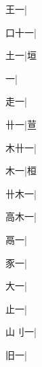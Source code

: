 \begin{multicols}{2}
{{\cjk{}{\cnsym{}　}王一}|{}\par
{\cjk{}口十一}|{}\par
{\cjk{}{\cnsym{}　}土一}|{\cjk{}垣}\par
{一}|{}\par
{\cjk{}{\cnsym{}　}走一}|{}\par
{\cjk{}{\cnsym{}　}卄一}|{\cjk{}荁}\par
{\cjk{}木卄一}|{}\par
{\cjk{}{\cnsym{}　}木一}|{\cjk{}桓}\par
{\cjk{}卄木一}|{}\par
{\cjk{}高木一}|{}\par
{\cjk{}{\cnsym{}　}鬲一}|{}\par
{\cjk{}{\cnsym{}　}豕一}|{}\par
{\cjk{}{\cnsym{}　}大一}|{}\par
{\cjk{}{\cnsym{}　}止一}|{}\par
{\cjk{}山{\cnxHanaA{}刂}一}|{}\par
{旧一}|{}\par
}
\end{multicols}
